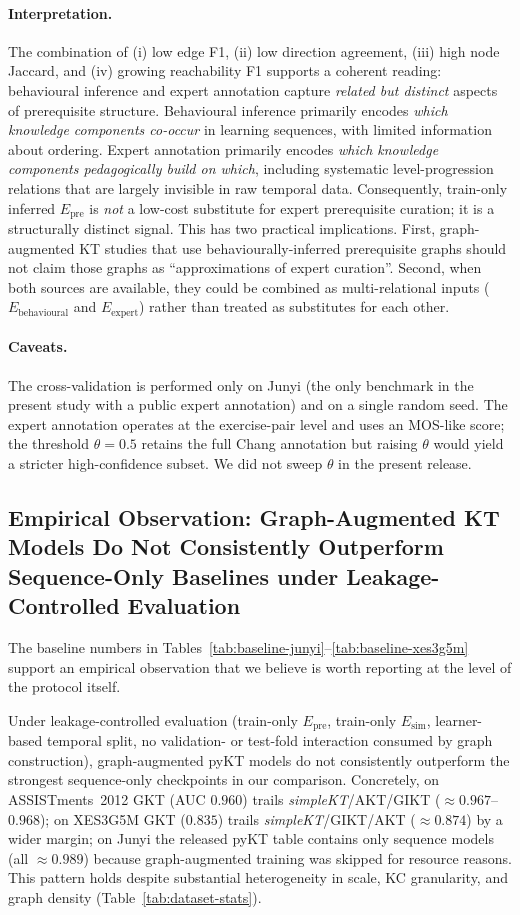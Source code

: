 \documentclass[runningheads]{llncs}
\newcommand{\Epre}{\ensuremath{E_{\text{pre}}}}
\newcommand{\Esim}{\ensuremath{E_{\text{sim}}}}
\newcommand{\KCs}{knowledge components}
\begin{document}
\paragraph{Interpretation.}
The combination of (i) low edge F1, (ii) low direction agreement,
(iii) high node Jaccard, and (iv) growing reachability F1 supports a
coherent reading: behavioural inference and expert annotation capture
\emph{related but distinct} aspects of prerequisite structure.
Behavioural inference primarily encodes \emph{which \KCs{} co-occur}
in learning sequences, with limited information about ordering.
Expert annotation primarily encodes \emph{which \KCs{} pedagogically
build on which}, including systematic level-progression relations
that are largely invisible in raw temporal data.
Consequently, train-only inferred $\Epre$ is \emph{not} a low-cost
substitute for expert prerequisite curation; it is a structurally
distinct signal. This has two practical implications. First,
graph-augmented KT studies that use behaviourally-inferred prerequisite
graphs should not claim those graphs as ``approximations of expert
curation''. Second, when both sources are available, they could be
combined as multi-relational inputs ($E_{\text{behavioural}}$ and
$E_{\text{expert}}$) rather than treated as substitutes for each other.

\paragraph{Caveats.}
The cross-validation is performed only on Junyi (the only benchmark
in the present study with a public expert annotation) and on a single
random seed. The expert annotation operates at the exercise-pair level
and uses an MOS-like score; the threshold $\theta=0.5$ retains the
full Chang annotation but raising $\theta$ would yield a stricter
high-confidence subset. We did not sweep $\theta$ in the present
release.
\subsection{Empirical Observation: Graph-Augmented KT Models Do Not
Consistently Outperform Sequence-Only Baselines under
Leakage-Controlled Evaluation}
\label{sec:exp-fextra}
The baseline numbers in Tables~\ref{tab:baseline-junyi}--\ref{tab:baseline-xes3g5m}
support an empirical observation that we believe is worth reporting at the level
of the protocol itself.

Under leakage-controlled evaluation (train-only $\Epre$, train-only
$\Esim$, learner-based temporal split, no validation- or test-fold
interaction consumed by graph construction), graph-augmented pyKT models
do not consistently outperform the strongest sequence-only checkpoints in
our comparison. Concretely, on ASSISTments~2012 GKT (AUC $0.960$) trails
\textit{simpleKT}/AKT/GIKT ($\approx 0.967$--$0.968$); on XES3G5M GKT
($0.835$) trails \textit{simpleKT}/GIKT/AKT ($\approx 0.874$) by a wider
margin; on Junyi the released pyKT table contains only sequence models
(all $\approx 0.989$) because graph-augmented training was skipped for
resource reasons. This pattern holds despite substantial heterogeneity in
scale, KC granularity, and graph density (Table~\ref{tab:dataset-stats}).
\end{document}
